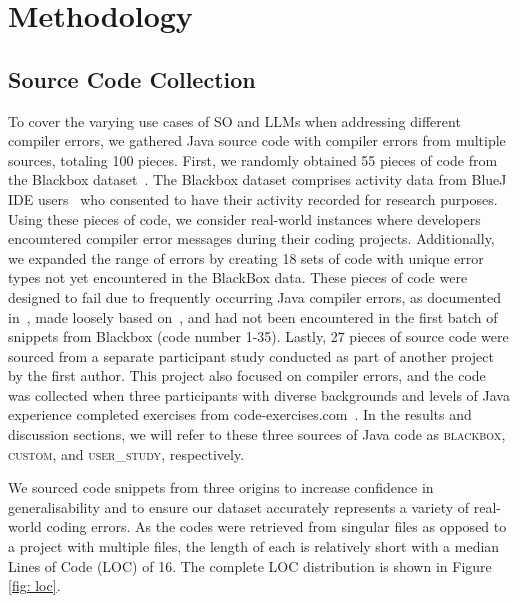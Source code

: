 \documentclass[preprint,12pt]{elsarticle}
\begin{document}
\section{Methodology}
\label{sec:methodology}

\subsection{Source Code Collection}

To cover the varying use cases of SO and LLMs when addressing different compiler errors, we gathered Java source code with compiler errors from multiple sources, totaling 100 pieces. First, we randomly obtained 55 pieces of code from the Blackbox dataset~\cite{t22}. The Blackbox dataset comprises activity data from BlueJ IDE users~\cite{r22} who consented to have their activity recorded for research purposes. Using these pieces of code, we consider real-world instances where developers encountered compiler error messages during their coding projects. Additionally, we expanded the range of errors by creating 18 sets of code with unique error types not yet encountered in the BlackBox data. These pieces of code were designed to fail due to frequently occurring Java compiler errors, as documented in~\cite{r23, r24}, made loosely based on~\cite{t23,new1}, and had not been encountered in the first batch of snippets from Blackbox (code number 1-35).  Lastly, 27 pieces of source code were sourced from a separate participant study conducted as part of another project by the first author. This project also focused on compiler errors, and the code was collected when three participants with diverse backgrounds and levels of Java experience completed exercises from code-exercises.com~\cite{t24}. In the results and discussion sections, we will refer to these three sources of Java code as \textsc{blackbox}, \textsc{custom}, and \textsc{user\_study}, respectively.  

We sourced code snippets from three origins to increase confidence in generalisability and to ensure our dataset accurately represents a variety of real-world coding errors. As the codes were retrieved from singular files as opposed to a project with multiple files, the length of each is relatively short with a median Lines of Code (LOC) of 16. The complete LOC distribution is shown in Figure \ref{fig: loc}.
\end{document}
